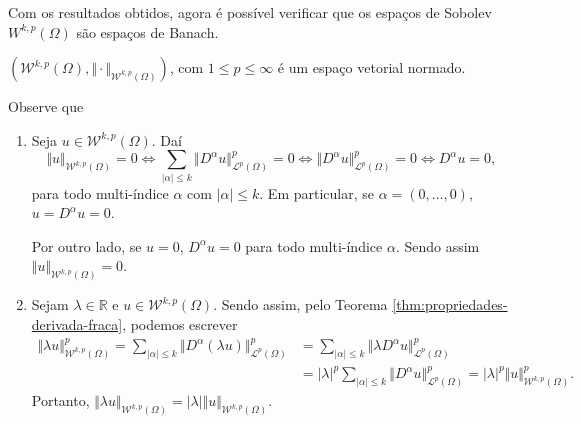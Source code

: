 \documentclass[a4paper, 11pt]{book}
\theoremstyle{definition}
\newcommand{\bR}{\mathbb{R}}
\newcommand{\cL}{\mathcal{L}}
\newcommand{\cW}{\mathcal{W}}
\begin{document}
Com os resultados obtidos, agora é possível verificar que os espaços de Sobolev $W^{k,p}(\Omega)$ são espaços de Banach.

\begin{tbox}
    $(\cW^{k,p}(\Omega), \Vert \cdot \Vert_{\cW^{k,p}(\Omega)})$, com $1 \leqslant p \leqslant \infty$ é um espaço vetorial normado.
\end{tbox}
\begin{prf}
    Observe que
    \begin{enumerate}[leftmargin=*]
        \item Seja $u \in \cW^{k,p}(\Omega)$. Daí
        \[
            \Vert u \Vert_{\cW^{k,p}(\Omega)} = 0 \iff \sum_{|\alpha| \leqslant k} \Vert D^\alpha u \Vert_{\cL^p(\Omega)}^p = 0 \iff \Vert D^\alpha u \Vert_{\cL^p(\Omega)}^p = 0 \iff D^\alpha u = 0,
        \]
        para todo multi-índice $\alpha$ com $|\alpha| \leqslant k$.
        Em particular, se $\alpha = (0,\dots,0)$, $u = D^\alpha u = 0$.

        Por outro lado, se $u = 0$, $D^\alpha u = 0$ para todo multi-índice $\alpha$. Sendo assim $\Vert u \Vert_{\cW^{k,p}(\Omega)} = 0$.

        \item Sejam $\lambda \in \bR$ e $u \in \cW^{k,p}(\Omega)$. Sendo assim, pelo Teorema \ref{thm:propriedades-derivada-fraca}, podemos escrever
        \[
            \begin{aligned}
                \Vert \lambda u \Vert_{\cW^{k,p}(\Omega)}^p = \sum_{|\alpha| \leqslant k} \Vert D^\alpha (\lambda u) \Vert_{\cL^p(\Omega)}^p &= \sum_{|\alpha| \leqslant k} \Vert \lambda D^\alpha u \Vert_{\cL^p(\Omega)}^p\\ 
                &= |\lambda|^p\sum_{|\alpha| \leqslant k} \Vert D^\alpha u \Vert_{\cL^p(\Omega)}^p = |\lambda|^p\Vert u \Vert_{\cW^{k,p}(\Omega)}^p.
            \end{aligned}
        \]
        Portanto, $\Vert \lambda u \Vert_{\cW^{k,p}(\Omega)} = |\lambda|\Vert u \Vert_{\cW^{k,p}(\Omega)}$.


\end{enumerate}
\end{prf}
\end{document}

